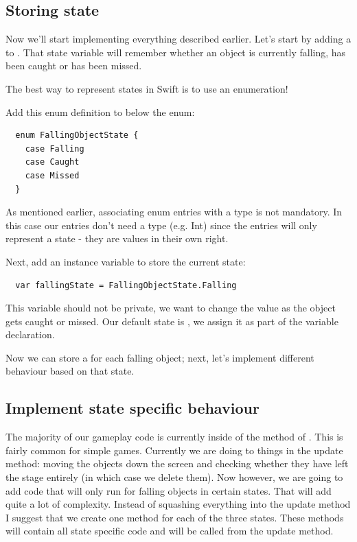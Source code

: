 \subsection{Storing state}
Now we'll start implementing everything described earlier. Let's start by adding
a  to . That state
variable will remember whether an object is currently falling, has been caught
or has been missed.

The best way to represent states in Swift is to use an enumeration!
\begin{leftbar}
Add this enum definition to  below the
 enum:
\begin{lstlisting}
  enum FallingObjectState {
    case Falling
    case Caught
    case Missed
  }
\end{lstlisting}
\end{leftbar}
As mentioned earlier, associating enum entries with a type is not
mandatory. In this case our entries don't need a type (e.g. Int) since the
entries will only represent a state - they are values in their own right.

\begin{leftbar}
Next, add an instance variable to store the current state:
\begin{lstlisting}
  var fallingState = FallingObjectState.Falling
\end{lstlisting}
\end{leftbar}
This variable should not be private, we want to change the value as
the object gets caught or missed. Our default state is , we
assign it as part of the variable declaration.

Now we can store a  for each falling object; next,
let's implement different behaviour based on that state.

\subsection{Implement state specific behaviour}
The majority of our gameplay code is currently inside of the 
method of . This is fairly common for simple games.
Currently we are doing to things in the update method: moving the objects down
the screen and checking whether they have left the stage entirely (in which
case we delete them). Now however, we are going to add code that will only run
for falling objects in certain states. That will add quite a lot of complexity.
Instead of squashing everything into the update method I suggest that we
create one method for each of the three states. These methods will contain
all state specific code and will be called from the update method.

